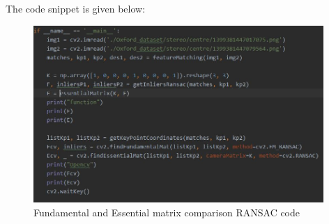 \documentclass[12pt]{article}
\begin{document}
The code snippet is given below:
\newpage
\begin{figure}[h]
    \centering
    \includegraphics[width=11cm]{ransac1}
    \caption{Fundamental and Essential matrix comparison RANSAC code}
    \label{fig:Fundamental and Essential matrix comparison RANSAC code}
\end{figure}
\end{document}
